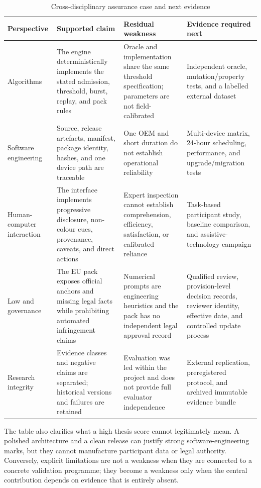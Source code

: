 \begin{table}[H]
\centering
\caption{Cross-disciplinary assurance case and next evidence}
\label{tab:assurance-case}
\scriptsize
\begin{tabular}{>{\raggedright\arraybackslash}p{}>{\raggedright\arraybackslash}p{}>{\raggedright\arraybackslash}p{}>{\raggedright\arraybackslash}p{}}
\toprule
Perspective & Supported claim & Residual weakness & Evidence required next \\
\midrule
Algorithms & The engine deterministically implements the stated admission, threshold, burst, replay, and pack rules & Oracle and implementation share the same threshold specification; parameters are not field-calibrated & Independent oracle, mutation/property tests, and a labelled external dataset \\
Software engineering & Source, release artefacts, manifest, package identity, hashes, and one device path are traceable & One OEM and short duration do not establish operational reliability & Multi-device matrix, 24-hour scheduling, performance, and upgrade/migration tests \\
Human-computer interaction & The interface implements progressive disclosure, non-colour cues, provenance, caveats, and direct actions & Expert inspection cannot establish comprehension, efficiency, satisfaction, or calibrated reliance & Task-based participant study, baseline comparison, and assistive-technology campaign \\
Law and governance & The EU pack exposes official anchors and missing legal facts while prohibiting automated infringement claims & Numerical prompts are engineering heuristics and the pack has no independent legal approval record & Qualified review, provision-level decision records, reviewer identity, effective date, and controlled update process \\
Research integrity & Evidence classes and negative claims are separated; historical versions and failures are retained & Evaluation was led within the project and does not provide full evaluator independence & External replication, preregistered protocol, and archived immutable evidence bundle \\
\bottomrule
\end{tabular}
\end{table}

The table also clarifies what a high thesis score cannot legitimately mean. A polished architecture and a clean release can justify strong software-engineering marks, but they cannot manufacture participant data or legal authority. Conversely, explicit limitations are not a weakness when they are connected to a concrete validation programme; they become a weakness only when the central contribution depends on evidence that is entirely absent.

